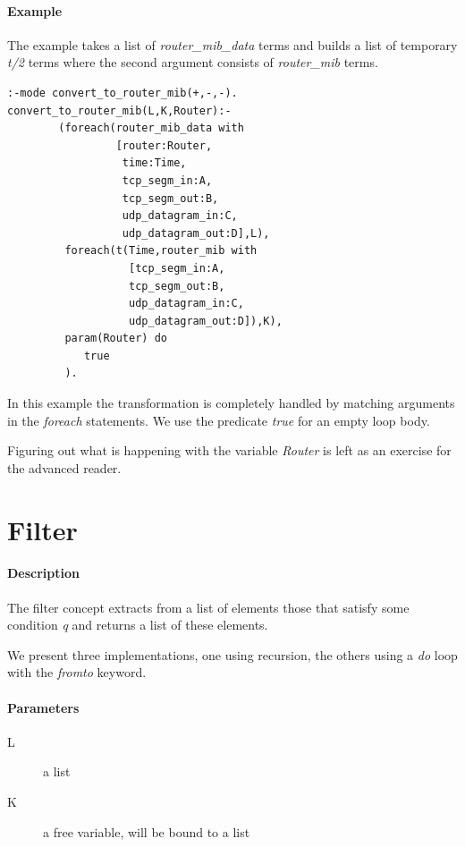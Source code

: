 \documentclass[a4paper,12pt]{report}
\begin{document}
\pagebreak
\paragraph{Example}
The example takes a list of {\it router\_mib\_data} terms and builds a list of temporary {\it t/2} terms where the second argument consists of {\it router\_mib} terms.
\begin{verbatim}
:-mode convert_to_router_mib(+,-,-).
convert_to_router_mib(L,K,Router):-
        (foreach(router_mib_data with 
                 [router:Router,
                  time:Time,
                  tcp_segm_in:A,
                  tcp_segm_out:B,
                  udp_datagram_in:C,
                  udp_datagram_out:D],L),
         foreach(t(Time,router_mib with 
                   [tcp_segm_in:A,
                   tcp_segm_out:B,
                   udp_datagram_in:C,
                   udp_datagram_out:D]),K),
         param(Router) do
            true
         ).
\end{verbatim}
In this example the transformation is completely handled by matching arguments in the {\it foreach} statements. We use the predicate {\it true} for an empty loop body.

Figuring out what is happening with the variable {\it Router} is left as an exercise for the advanced reader.
\pagebreak
\section{Filter}
\paragraph{Description}
The filter concept extracts from a list of elements those that satisfy some condition {\it q} and returns a list of these elements.

We present three implementations, one using recursion, the others using a {\it do} loop with the {\it fromto} keyword.
\paragraph{Parameters}
\begin{description}
\item[L] a list
\item[K] a free variable, will be bound to a list
\end{description}
\end{document}
